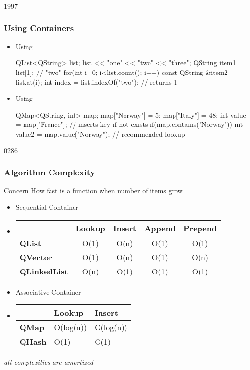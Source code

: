 \begin{slide}[fragile]{1997}\frametitle{Using Containers}
  \begin{itemize}
  \item Using 
    \begin{cpp}
QList<QString> list;
list << "one" << "two" << "three";
QString item1 = list[1]; // "two"
for(int i=0; i<list.count(); i++) { 
  const QString &item2 = list.at(i);
}
int index = list.indexOf("two"); // returns 1
    \end{cpp}
  \item Using 
    \begin{cpp}
QMap<QString, int> map;
map["Norway"] = 5; map["Italy"] = 48;
int value = map["France"]; // inserts key if not exists
if(map.contains("Norway")) {
  int value2 = map.value("Norway"); // recommended lookup
}
  \end{cpp}

  \end{itemize}
\end{slide}

\begin{slide}[fragile]{0286}\frametitle{Algorithm Complexity}
  \begin{block}{Concern}
    How fast is a function when number of items grow  
  \end{block}
  \begin{itemize}
  \item Sequential Container
  \item[] \begin{tabular}{l|c|c|c|c|}
        & \textbf{Lookup} & \textbf{Insert} & \textbf{Append} & \textbf{Prepend}\\\hline
        \textbf{QList} & O(1) & O(n) & O(1) & O(1)\\\hline
        \textbf{QVector} & O(1) & O(n) & O(1) & O(n)\\\hline
        \textbf{QLinkedList} & O(n) & O(1) & O(1) & O(1)\\\hline
      \end{tabular}
      \medskip
  \item Associative Container
      \medskip
  \item[] \begin{tabular}{l|l|l|}
        & \textbf{Lookup} & \textbf{Insert} \\\hline
        \textbf{QMap} & O(log(n)) &  O(log(n)) \\
        \textbf{QHash} & O(1) & O(1) \\\hline
      \end{tabular}
  \end{itemize}
  \vspace{-5mm}\hfill\textit{all complexities are amortized}
\end{slide}

